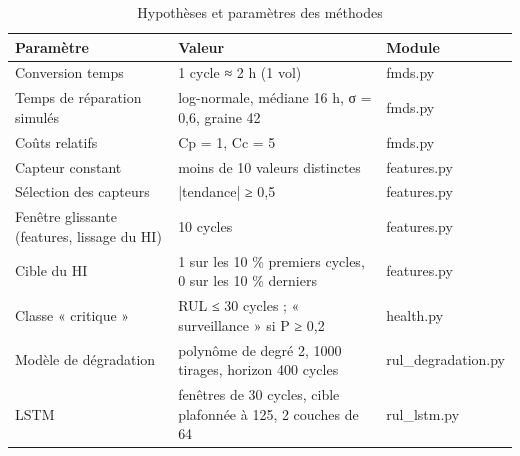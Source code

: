 \begin{table}[htbp]
\centering
\caption{Hypothèses et paramètres des méthodes}
\label{tab:hypotheses_parametres}
\begin{tabular}{lll}
\toprule
Paramètre & Valeur & Module \\
\midrule
Conversion temps & 1 cycle ≈ 2 h (1 vol) & fmds.py \\
Temps de réparation simulés & log-normale, médiane 16 h, σ = 0,6, graine 42 & fmds.py \\
Coûts relatifs & Cp = 1, Cc = 5 & fmds.py \\
Capteur constant & moins de 10 valeurs distinctes & features.py \\
Sélection des capteurs & |tendance| ≥ 0,5 & features.py \\
Fenêtre glissante (features, lissage du HI) & 10 cycles & features.py \\
Cible du HI & 1 sur les 10 \% premiers cycles, 0 sur les 10 \% derniers & features.py \\
Classe « critique » & RUL ≤ 30 cycles ; « surveillance » si P ≥ 0,2 & health.py \\
Modèle de dégradation & polynôme de degré 2, 1000 tirages, horizon 400 cycles & rul\_degradation.py \\
LSTM & fenêtres de 30 cycles, cible plafonnée à 125, 2 couches de 64 & rul\_lstm.py \\
\bottomrule
\end{tabular}
\end{table}
